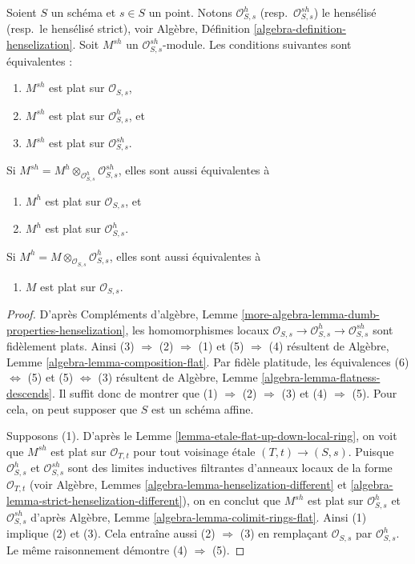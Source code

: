 \begin{lemma}
\label{lemma-flat-up-down-henselization}
Soient $S$ un schéma et $s \in S$ un point. Notons $\mathcal{O}_{S, s}^h$
(resp.\ $\mathcal{O}_{S, s}^{sh}$) le hensélisé (resp.\ le hensélisé
strict), voir
Algèbre, Définition \ref{algebra-definition-henselization}.
Soit $M^{sh}$ un $\mathcal{O}_{S, s}^{sh}$-module.
Les conditions suivantes sont équivalentes :
\begin{enumerate}
\item $M^{sh}$ est plat sur $\mathcal{O}_{S, s}$,
\item $M^{sh}$ est plat sur $\mathcal{O}_{S, s}^h$, et
\item $M^{sh}$ est plat sur $\mathcal{O}_{S, s}^{sh}$.
\end{enumerate}
Si $M^{sh} = M^h \otimes_{\mathcal{O}_{S, s}^h} \mathcal{O}_{S, s}^{sh}$,
elles sont aussi équivalentes à
\begin{enumerate}
\item[(4)] $M^h$ est plat sur $\mathcal{O}_{S, s}$, et
\item[(5)] $M^h$ est plat sur $\mathcal{O}_{S, s}^h$.
\end{enumerate}
Si $M^h = M \otimes_{\mathcal{O}_{S, s}} \mathcal{O}_{S, s}^h$,
elles sont aussi équivalentes à
\begin{enumerate}
\item[(6)] $M$ est plat sur $\mathcal{O}_{S, s}$.
\end{enumerate}
\end{lemma}

\begin{proof}
D'après Compléments d'algèbre, Lemme
\ref{more-algebra-lemma-dumb-properties-henselization},
les homomorphismes locaux
$\mathcal{O}_{S, s} \to \mathcal{O}_{S, s}^h \to \mathcal{O}_{S, s}^{sh}$
sont fidèlement plats.
Ainsi (3) $\Rightarrow$ (2) $\Rightarrow$ (1) et
(5) $\Rightarrow$ (4) résultent de
Algèbre, Lemme \ref{algebra-lemma-composition-flat}.
Par fidèle platitude, les équivalences (6) $\Leftrightarrow$ (5) et
(5) $\Leftrightarrow$ (3) résultent de
Algèbre, Lemme \ref{algebra-lemma-flatness-descends}.
Il suffit donc de montrer que
(1) $\Rightarrow$ (2) $\Rightarrow$ (3) et
(4) $\Rightarrow$ (5).
Pour cela, on peut supposer que $S$ est un schéma affine.

\medskip\noindent
Supposons (1). D'après
le Lemme \ref{lemma-etale-flat-up-down-local-ring},
on voit que $M^{sh}$ est plat sur $\mathcal{O}_{T, t}$ pour
tout voisinage \'etale $(T, t) \to (S, s)$. Puisque $\mathcal{O}_{S, s}^h$
et $\mathcal{O}_{S, s}^{sh}$ sont des limites inductives filtrantes d'anneaux locaux
de la forme $\mathcal{O}_{T, t}$ (voir
Algèbre, Lemmes \ref{algebra-lemma-henselization-different}
et \ref{algebra-lemma-strict-henselization-different}),
on en conclut que $M^{sh}$ est plat sur $\mathcal{O}_{S, s}^h$
et $\mathcal{O}_{S, s}^{sh}$ d'après
Algèbre, Lemme \ref{algebra-lemma-colimit-rings-flat}.
Ainsi (1) implique (2) et (3). Cela entraîne aussi
(2) $\Rightarrow$ (3) en remplaçant $\mathcal{O}_{S, s}$ par
$\mathcal{O}_{S, s}^h$. Le même raisonnement démontre
(4) $\Rightarrow$ (5).
\end{proof}

